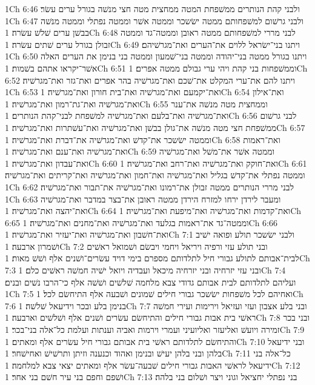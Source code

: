 1Ch 6:46  ולבני קהת הנותרים ממשׁפחת המטה ממחצית מטה חצי מנשׁה בגורל ערים עשׂר׃
1Ch 6:47  ולבני גרשׁום למשׁפחותם ממטה ישׂשכר וממטה אשׁר וממטה נפתלי וממטה מנשׁה בבשׁן ערים שׁלשׁ עשׂרה׃
1Ch 6:48  לבני מררי למשׁפחותם ממטה ראובן וממטה־גד וממטה זבולן בגורל ערים שׁתים עשׂרה׃
1Ch 6:49  ויתנו בני־ישׂראל ללוים את־הערים ואת־מגרשׁיהם׃
1Ch 6:50  ויתנו בגורל ממטה בני־יהודה וממטה בני־שׁמעון וממטה בני בנימן את הערים האלה אשׁר־יקראו אתהם בשׁמות׃
1Ch 6:51  וממשׁפחות בני קהת ויהי ערי גבולם ממטה אפרים׃
1Ch 6:52  ויתנו להם את־ערי המקלט את־שׁכם ואת־מגרשׁיה בהר אפרים ואת־גזר ואת־מגרשׁיה׃
1Ch 6:53  ואת־יקמעם ואת־מגרשׁיה ואת־בית חורון ואת־מגרשׁיה׃
1Ch 6:54  ואת־אילון ואת־מגרשׁיה ואת־גת־רמון ואת־מגרשׁיה׃
1Ch 6:55  וממחצית מטה מנשׁה את־ענר ואת־מגרשׁיה ואת־בלעם ואת־מגרשׁיה למשׁפחת לבני־קהת הנותרים׃
1Ch 6:56  לבני גרשׁום ממשׁפחת חצי מטה מנשׁה את־גולן בבשׁן ואת־מגרשׁיה ואת־עשׁתרות ואת־מגרשׁיה׃
1Ch 6:57  וממטה ישׂשכר את־קדשׁ ואת־מגרשׁיה את־דברת ואת־מגרשׁיה׃
1Ch 6:58  ואת־ראמות ואת־מגרשׁיה ואת־ענם ואת־מגרשׁיה׃
1Ch 6:59  וממטה אשׁר את־משׁל ואת־מגרשׁיה ואת־עבדון ואת־מגרשׁיה׃
1Ch 6:60  ואת־חוקק ואת־מגרשׁיה ואת־רחב ואת־מגרשׁיה׃
1Ch 6:61  וממטה נפתלי את־קדשׁ בגליל ואת־מגרשׁיה ואת־חמון ואת־מגרשׁיה ואת־קריתים ואת־מגרשׁיה׃
1Ch 6:62  לבני מררי הנותרים ממטה זבולן את־רמונו ואת־מגרשׁיה את־תבור ואת־מגרשׁיה׃
1Ch 6:63  ומעבר לירדן ירחו למזרח הירדן ממטה ראובן את־בצר במדבר ואת־מגרשׁיה ואת־יהצה ואת־מגרשׁיה׃
1Ch 6:64  ואת־קדמות ואת־מגרשׁיה ואת־מיפעת ואת־מגרשׁיה׃
1Ch 6:65  וממטה־גד את־ראמות בגלעד ואת־מגרשׁיה ואת־מחנים ואת־מגרשׁיה׃
1Ch 6:66  ואת־חשׁבון ואת־מגרשׁיה ואת־יעזיר ואת־מגרשׁיה׃
1Ch 7:1  ולבני ישׂשכר תולע ופואה ישׁיב ושׁמרון ארבעה׃
1Ch 7:2  ובני תולע עזי ורפיה ויריאל ויחמי ויבשׂם ושׁמואל ראשׁים לבית־אבותם לתולע גבורי חיל לתלדותם מספרם בימי דויד עשׂרים־ושׁנים אלף ושׁשׁ מאות׃
1Ch 7:3  ובני עזי יזרחיה ובני יזרחיה מיכאל ועבדיה ויואל ישׁיה חמשׁה ראשׁים כלם׃
1Ch 7:4  ועליהם לתלדותם לבית אבותם גדודי צבא מלחמה שׁלשׁים ושׁשׁה אלף כי־הרבו נשׁים ובנים׃
1Ch 7:5  ואחיהם לכל משׁפחות ישׂשכר גבורי חילים שׁמונים ושׁבעה אלף התיחשׂם לכל׃
1Ch 7:6  בנימן בלע ובכר וידיעאל שׁלשׁה׃
1Ch 7:7  ובני בלע אצבון ועזי ועזיאל וירימות ועירי חמשׁה ראשׁי בית אבות גבורי חילים והתיחשׂם עשׂרים ושׁנים אלף ושׁלשׁים וארבעה׃
1Ch 7:8  ובני בכר זמירה ויועשׁ ואליעזר ואליועיני ועמרי וירמות ואביה וענתות ועלמת כל־אלה בני־בכר׃
1Ch 7:9  והתיחשׂם לתלדותם ראשׁי בית אבותם גבורי חיל עשׂרים אלף ומאתים׃
1Ch 7:10  ובני ידיעאל בלהן ובני בלהן יעישׁ ובנימן ואהוד וכנענה וזיתן ותרשׁישׁ ואחישׁחר׃
1Ch 7:11  כל־אלה בני ידיעאל לראשׁי האבות גבורי חילים שׁבעה־עשׂר אלף ומאתים יצאי צבא למלחמה׃
1Ch 7:12  ושׁפם וחפם בני עיר חשׁם בני אחר׃
1Ch 7:13  בני נפתלי יחציאל וגוני ויצר ושׁלום בני בלהה׃
